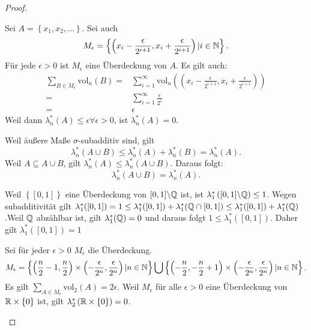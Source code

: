 \begin{proof}
	\begin{parts}
	\item	Sei $A=\left\{ x_1,x_2,\dots \right\} $. Sei auch
		\[
			M_\epsilon=\left\{\left( x_i-\frac{\epsilon}{2^{i+1}},x_i+\frac{\epsilon}{2^{i+1}}\right)|i\in\mathbb{N}  \right\} 
		.\] 
		F\"{u}r jede $\epsilon>0$ ist $M_\epsilon$ eine \"{U}berdeckung von $A$. Es gilt auch:
		\begin{align*}
			\sum_{B \in M_\epsilon} \text{vol}_n(B)=& \sum_{i=1}^\infty \text{vol}_n\left( \left( x_i-\frac{\epsilon}{2^{i+1}},x_i+\frac{\epsilon}{2^{i+1}} \right)  \right) \\
			=&\sum_{i=1}^{\infty} \frac{\epsilon}{2^i}\\
			=&\epsilon
		\end{align*}
		Weil dann $\lambda_n^*(A)\le \epsilon\forall \epsilon>0$, ist $\lambda_n^*(A)=0$.
	\item Weil äußere Maße $\sigma$-subadditiv sind, gilt
		\[
			\lambda_n^*(A\cup B)\le \lambda_n^*(A)+\lambda_n^*(B)=\lambda_n^*(A)
		.\] 
		Weil $A\subseteq A\cup B$, gilt $\lambda_n^*(A)\le \lambda_n^*(A\cup B)$. Daraus folgt:
		\[
		\lambda_n^*(A\cup B)=\lambda_n^*(A)
		.\] 
	\item Weil $\left\{ [0,1] \right\} $ eine \"{U}berdeckung von $[0,1]\backslash \mathbb{Q}$ ist, ist $\lambda_1^*\left( [0,1]\backslash\mathbb{Q} \right) \le 1$. Wegen subadditivität gilt $\lambda_1^*([0,1])=1\le \lambda_1^*([0,1])+\lambda_1^*(\mathbb{Q}\cap [0,1])\le \lambda_1^*([0,1])+\lambda_1^*(\mathbb{Q})$.Weil $\mathbb{Q}$ abz\"{a}hlbar ist, gilt $\lambda_1^*(\mathbb{Q})=0$ und daraus folgt $1\le \lambda_1^*\left( [0,1] \right) $. Daher gilt $\lambda_1^*\left( [0,1] \right) =1$
	\item Sei f\"{u}r jeder $\epsilon>0$ $M_\epsilon$ die \"{U}berdeckung. 
		\[
		M_\epsilon=\left\{ \left( \frac{n}{2}-1,\frac{n}{2} \right) \times \left( -\frac{\epsilon}{2^n},\frac{\epsilon}{2^n} \right)|n\in \mathbb{N}  \right\} \bigcup \left\{ \left( -\frac{n}{2},-\frac{n}{2}+1 \right) \times \left( -\frac{\epsilon}{2^n},\frac{\epsilon}{2^n} \right)|n\in \mathbb{N}  \right\} 
		.\] 
		Es gilt $\sum_{A\in M_\epsilon} \text{vol}_2(A)=2\epsilon$. Weil $M_\epsilon$ f\"{u}r alle $\epsilon>0$ eine \"{U}berdeckung von $\mathbb{R}\times \left\{ 0 \right\} $ ist, gilt $\lambda_2^*\left( \mathbb{R}\times \left\{ 0 \right\}  \right) =0$.
	\end{parts}
\end{proof}
